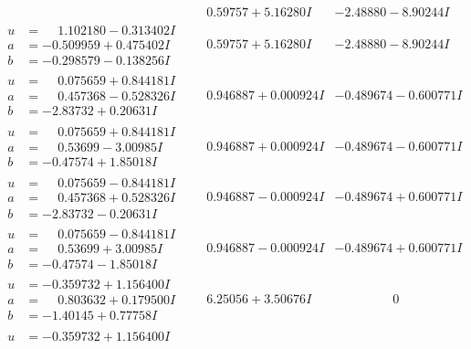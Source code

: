 \documentclass[1p]{elsarticle_modified}
\theoremstyle{definition}
\begin{document}
$$\begin{array}{c|c|c}
 & \phantom{-}0.59757 + 5.16280 I & -2.48880 - 8.90244 I \\ \hline\begin{aligned}
u &= \phantom{-}1.102180 - 0.313402 I \\
a &= -0.509959 + 0.475402 I \\
b &= -0.298579 - 0.138256 I\end{aligned}
 & \phantom{-}0.59757 + 5.16280 I & -2.48880 - 8.90244 I \\ \hline\begin{aligned}
u &= \phantom{-}0.075659 + 0.844181 I \\
a &= \phantom{-}0.457368 - 0.528326 I \\
b &= -2.83732 + 0.20631 I\end{aligned}
 & \phantom{-}0.946887 + 0.000924 I & -0.489674 - 0.600771 I \\ \hline\begin{aligned}
u &= \phantom{-}0.075659 + 0.844181 I \\
a &= \phantom{-}0.53699 - 3.00985 I \\
b &= -0.47574 + 1.85018 I\end{aligned}
 & \phantom{-}0.946887 + 0.000924 I & -0.489674 - 0.600771 I \\ \hline\begin{aligned}
u &= \phantom{-}0.075659 - 0.844181 I \\
a &= \phantom{-}0.457368 + 0.528326 I \\
b &= -2.83732 - 0.20631 I\end{aligned}
 & \phantom{-}0.946887 - 0.000924 I & -0.489674 + 0.600771 I \\ \hline\begin{aligned}
u &= \phantom{-}0.075659 - 0.844181 I \\
a &= \phantom{-}0.53699 + 3.00985 I \\
b &= -0.47574 - 1.85018 I\end{aligned}
 & \phantom{-}0.946887 - 0.000924 I & -0.489674 + 0.600771 I \\ \hline\begin{aligned}
u &= -0.359732 + 1.156400 I \\
a &= \phantom{-}0.803632 + 0.179500 I \\
b &= -1.40145 + 0.77758 I\end{aligned}
 & \phantom{-}6.25056 + 3.50676 I & \phantom{-0.000000 } 0 \\ \hline\begin{aligned}
u &= -0.359732 + 1.156400 I \\

\end{aligned}
\end{array}$$
\end{document}
